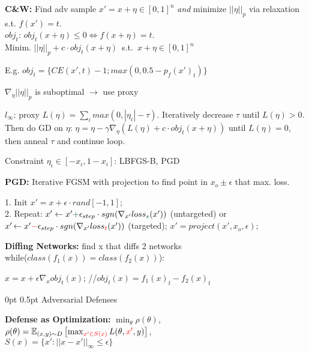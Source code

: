 \documentclass[11pt,landscape,a4paper,fleqn]{article}
\makeatletter
\renewcommand{\section}{\@startsection{section}{1}{0mm}%
                                {0pt}%
                                {0.5pt}%
                                {\color{myorange}\sffamily\small\bfseries}}
\makeatother
\begin{document}
\begin{multicols*}{4}
\textbf{C\&W:} Find adv sample $x' = x + \eta \in [0,1]^n$ \textit{and} minimize $||\eta||_p$ via relaxation s.t. $f(x') = t$.\\
$obj_t$: $obj_t(x+\eta) \leq 0 \Leftrightarrow f(x+\eta) = t$.\\
Minim. \mbox{{$||\eta||_p + c \cdot obj_t(x+\eta)$ s.t. $x+\eta \in [0,1]^n$}}


E.g. {\fontsize{9.5}{6}\selectfont \mbox{$obj_t = \{ CE(x', t) - 1; max(0, 0.5 - p_f(x')_t)\}$}}

$\nabla_\eta ||\eta||_p$ is suboptimal $\rightarrow$ use proxy 

$l_\infty$: proxy $L(\eta) = \sum_i max(0, |\eta_i| - \tau)$. Iteratively decrease $\tau$ until $L(\eta)>0$. Then do GD on $\eta$: $\eta = \eta - \gamma \nabla_\eta(L(\eta) + c \cdot obj_t(x+\eta))$ until $L(\eta) = 0$, then anneal $\tau$ and continue loop.

Constraint $\eta_i \in [-x_i,1-x_i]$: LBFGS-B, PGD

\vspace*{1mm}


\textbf{PGD:} Iterative FGSM with projection to find point in $x_o \pm \epsilon$ that max. loss.

1. Init $x' = x + \epsilon \cdot rand[-1,1]$;\\
2. Repeat: $x' \leftarrow x' \textcolor{darkgreen}{+} \epsilon_{step} \cdot sgn(\nabla_{x'} loss_{\textcolor{darkgreen}{s}} (x'))$ (untargeted) or $x'\hspace*{-0.5mm} \leftarrow x' \textcolor{red}{-} \epsilon_{step} \cdot sgn(\nabla_{x'} loss_{\textcolor{red}{t}} (x'))$ (targeted);
$x' = project(x', x_o, \epsilon)$;
\vspace*{1mm}

\textbf{Diffing Networks:} find x that diffs 2 networks\\
while($class(f_1(x)) = class(f_2(x))$):

\quad $x = x + \epsilon \nabla_x obj_t(x)$;  {\fontsize{9.5}{6}\selectfont /\!\!/$obj_t(x) = f_1(x)_t - f_2(x)_t$}

\section{Adversarial Defenses}

\textbf{Defense as Optimization:} $\min_\theta \rho(\theta)$,
 {$\rho(\theta) = \mathbb{E}_{(x,y) \sim D} \left[ \max_{\textcolor{red}{x' \in S(x)}} L(\theta, \textcolor{red}{x'}, y) \right]$},\\
$S(x) = \{ x': ||x - x'||_\infty \leq \epsilon \}$


\end{multicols*}
\end{document}

